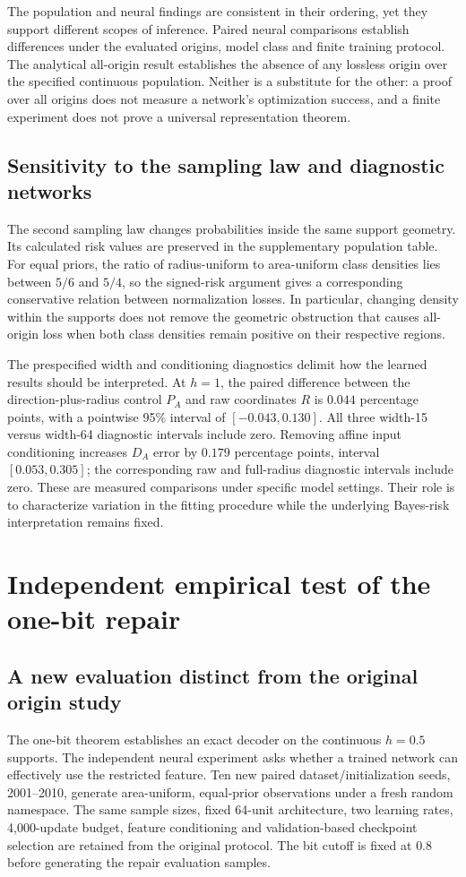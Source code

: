 \documentclass[12pt,a4paper]{article}
\begin{document}
The population and neural findings are consistent in their ordering, yet they support different scopes of inference. Paired neural comparisons establish differences under the evaluated origins, model class and finite training protocol. The analytical all-origin result establishes the absence of any lossless origin over the specified continuous population. Neither is a substitute for the other: a proof over all origins does not measure a network's optimization success, and a finite experiment does not prove a universal representation theorem.

\subsection{Sensitivity to the sampling law and diagnostic networks}
The second sampling law changes probabilities inside the same support geometry. Its calculated risk values are preserved in the supplementary population table. For equal priors, the ratio of radius-uniform to area-uniform class densities lies between \(5/6\) and \(5/4\), so the signed-risk argument gives a corresponding conservative relation between normalization losses. In particular, changing density within the supports does not remove the geometric obstruction that causes all-origin loss when both class densities remain positive on their respective regions.

The prespecified width and conditioning diagnostics delimit how the learned results should be interpreted. At \(h=1\), the paired difference between the direction-plus-radius control \(P_A\) and raw coordinates \(R\) is \(0.044\) percentage points, with a pointwise 95\% interval of \([-0.043,0.130]\). All three width-15 versus width-64 diagnostic intervals include zero. Removing affine input conditioning increases \(D_A\) error by \(0.179\) percentage points, interval \([0.053,0.305]\); the corresponding raw and full-radius diagnostic intervals include zero. These are measured comparisons under specific model settings. Their role is to characterize variation in the fitting procedure while the underlying Bayes-risk interpretation remains fixed.

\section{Independent empirical test of the one-bit repair}
\subsection{A new evaluation distinct from the original origin study}
The one-bit theorem establishes an exact decoder on the continuous \(h=0.5\) supports. The independent neural experiment asks whether a trained network can effectively use the restricted feature. Ten new paired dataset/initialization seeds, 2001--2010, generate area-uniform, equal-prior observations under a fresh random namespace. The same sample sizes, fixed 64-unit architecture, two learning rates, 4,000-update budget, feature conditioning and validation-based checkpoint selection are retained from the original protocol. The bit cutoff is fixed at \(0.8\) before generating the repair evaluation samples.
\end{document}
